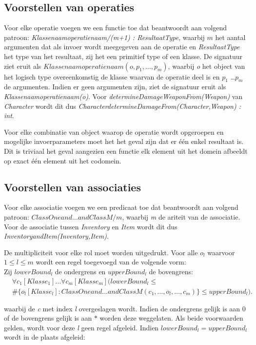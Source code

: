 \subsection{Voorstellen van operaties}
Voor elke operatie voegen we een functie toe dat beantwoordt aan volgend patroon: \sloppy
	 \textit{Klassenaamoperatienaam/(m+1) : ResultaatType}, waarbij $m$ het aantal argumenten dat als invoer wordt meegegeven aan de operatie en \textit{ResultaatType} het type van het resultaat, zij het een primitief type of een klasse. De signatuur ziet eruit als \textit{$Klassenaamoperatienaam(o,p_1,\ldots,p_m)$}, waarbij \textit{o} het object van het logisch type overeenkomstig de klasse waarvan de operatie deel is en \textit{$p_1$} \ldots \textit{$p_m$} de argumenten. Indien er geen argumenten zijn, ziet de signatuur eruit als \textit{Klassenaamoperatienaam(o)}. Voor \textit{determineDamageWeaponFrom(Weapon)} van \textit{Character} wordt dit dus \textit{CharacterdetermineDamageFrom(Character,Weapon) : int}.

Voor elke combinatie van object waarop de operatie wordt opgeroepen en mogelijke invoerparameters moet het het geval zijn dat er \'e\'en enkel resultaat is. Dit is triviaal het geval aangezien een functie elk element uit het domein afbeeldt op exact \'e\'en element uit het codomein.

\subsection{Voorstellen van associaties}
Voor elke associatie voegen we een predicaat toe dat beantwoordt aan volgend patroon: \textit{$ClassOneand\ldots{}andClassM/m$}, waarbij \textit{m} de ariteit van de associatie. Voor de associatie tussen \textit{Inventory} en \textit{Item} wordt dit dus \textit{InventoryandItem(Inventory,Item)}.

De multipliciteit voor elke rol moet worden uitgedrukt. Voor alle $o_l$ waarvoor $1 \leq l \leq m$ wordt een regel toegevoegd van de volgende vorm:\\

Zij $lowerBound_l$ de ondergrens en $upperBound_l$ de bovengrens:
\begin{align*}
	&\forall{c_1}[Klasse_1]\ldots\forall{c_m}[Klasse_m](lowerBound_l \leq
	\\
	&\#\{o_l[Klasse_l] : ClassOneand\ldots{}andClassM(c_1,\ldots,o_l,\ldots,c_m)\} \leq upperBound_l).
\end{align*}
	
waarbij de \textit{c} met index \textit{l} overgeslagen wordt. Indien de ondergrens gelijk is aan $0$ of de bovengrens gelijk is aan $*$ worden deze weggelaten. Als beide voorwaarden gelden, wordt voor deze \textit{l} geen regel afgeleid. Indien $lowerBound_l = upperBound_l$ wordt in de plaats afgeleid:
	
